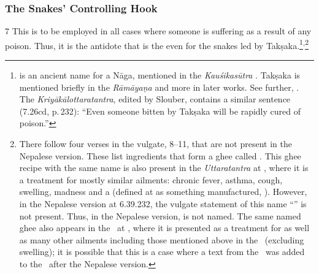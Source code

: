 \begin{translation}
\subsubsection{The Snakes' Controlling Hook}
\item[7]
                    This is to be employed in all cases where someone is
                    suffering as a result of any poison.  Thus, it is the
                    antidote that is the  even for the snakes led by
                    Takṣaka.\footnote{ is an ancient name
                        for a Nāga, mentioned in the \emph{Kauśikasūtra}
                        \citep[28.1 \emph{et passim},][78]{bloo-1890}.
                        Takṣaka is mentioned briefly in the \emph{Rāmāyaṇa}
                        \citep[292, n.\,13]{poll-1991} and more in later
                        works. See further, \cite[22, 26, 37, \emph{et
                        passim}]{slou-2016}.  The
                        \emph{Kriyākālottaratantra}, edited by Slouber,
                        contains a similar sentence (7.26cd, p.\,232): “Even
                        someone bitten by Takṣaka will be rapidly cured of
                        poison.”}\textsuperscript{,}\footnote{There follow
                            four verses in the vulgate, 8--11, that are not
                            present in the Nepalese version.  These list
                            ingredients that form a ghee called
                            . This ghee recipe with
                            the same name is also present in the
                            \emph{Uttaratantra} at , where
                            it is a treatment for mostly similar ailments:
                            chronic fever, asthma, cough, swelling, madness and a
                             (defined at
                             as something manufactured,
                            ).  However, in the Nepalese version at
                            6.39.232, the vulgate statement of this name
                            “” is
                            not present. Thus, in the Nepalese version,
                             is not named. The same
                            named ghee also appears in the \CS\ at
                            , where it is presented as a
                            treatment for  as well as many
                            other ailments including those mentioned above in the
                            \SS\ (excluding swelling); it is possible that this
                            is a case where a text from the \CS\ was added to the
                            \SS\ after the Nepalese version.}
        

\end{translation}
